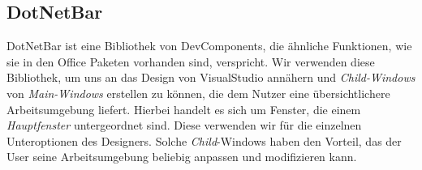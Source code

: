 \subsection{DotNetBar}
\label{dotnetbar}
DotNetBar ist eine Bibliothek von DevComponents, die ähnliche Funktionen, wie sie in den Office Paketen vorhanden sind, verspricht. Wir verwenden diese Bibliothek, um uns an das Design von VisualStudio annähern und \textit{Child-Windows} von \textit{Main-Windows} erstellen zu können, die dem Nutzer eine übersichtlichere Arbeitsumgebung liefert. Hierbei handelt es sich um Fenster, die einem \textit{Hauptfenster} untergeordnet sind. Diese verwenden wir für die einzelnen Unteroptionen des Designers. Solche \textit{Child}-Windows haben den Vorteil, das der User seine Arbeitsumgebung beliebig anpassen und modifizieren kann. 
